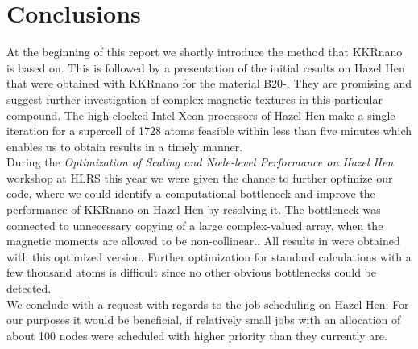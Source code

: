 \documentclass [a4paper, 12pt]{article}
\begin{document}
\section{Conclusions}
At the beginning of this report we shortly introduce the method that KKRnano is based on. 
This is followed by a presentation of the initial results on Hazel Hen that were obtained 
with KKRnano for the material B20-. 
They are promising and suggest further investigation
of complex magnetic textures in this particular compound.
The high-clocked Intel Xeon processors of Hazel Hen
make a single iteration for a supercell of 1728 atoms feasible within 
less than five minutes which enables us
to obtain results in a timely manner.\\

During the
\textit{Optimization of Scaling and Node-level Performance on Hazel Hen} workshop at HLRS this year we were
given the chance to further optimize our code, where we could identify a computational bottleneck and
improve the performance of KKRnano on Hazel Hen by resolving it. The bottleneck was
connected to unnecessary copying of a large complex-valued array, when the magnetic moments are allowed to be
non-collinear..
All results in  were
obtained with this optimized version.
Further optimization for standard calculations with a few thousand atoms 
is difficult since no other obvious bottlenecks could be detected.
\\
We conclude with a request with regards to the job scheduling on Hazel Hen:
For our purposes it would be beneficial, if relatively small jobs with an allocation of
about 100 nodes 
were scheduled with higher priority than they currently are.
\end{document}
